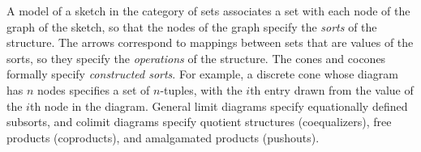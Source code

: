 \documentclass{beamer}
\begin{document}
\begin{frame}
A model of a sketch in the category of sets associates a set with each node of the graph of the sketch, so that the nodes of the graph specify the \emph{sorts} of the structure. The arrows correspond to mappings between sets that are values of the sorts, so they specify the \emph{operations} of the structure. The cones and cocones formally specify \emph{constructed sorts}. For example, a discrete cone whose diagram has $n$ nodes specifies a set of $n$-tuples, with the $i$th entry drawn from the value of the $i$th node in the diagram. General limit diagrams specify equationally defined subsorts, and colimit diagrams specify quotient structures (coequalizers), free products (coproducts), and amalgamated products (pushouts).
\end{frame}
\end{document}
